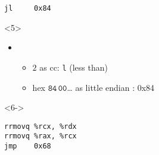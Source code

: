 \begin{frame}
\begin{columns}[t]
\begin{column}{0.5\textwidth}
\begin{visibleenv}
\begin{lstlisting}
jl     0x84
\end{lstlisting}
\end{visibleenv}
    \begin{onlyenv}<5>
        \begin{itemize}\item\itemflush\begin{itemize}
            \item $2$ as cc: {\tt l} (less than)
            \item hex $\mathtt{84\,00}$\ldots{} as little endian \Dest: 0x84
        \end{itemize}\end{itemize}
    \end{onlyenv}
\begin{visibleenv}<6->
\begin{lstlisting}
rrmovq %rcx, %rdx
rrmovq %rax, %rcx
jmp    0x68
\end{lstlisting}
\end{visibleenv}
\vspace{0cm}
\end{column}
\begin{column}{0.5\textwidth}
\vspace{0cm}
\begin{adjustbox}{max size={\textwidth}{\textheight}}
\end{adjustbox}
\vspace{0cm}
\end{column}
\end{columns}
\end{frame}


